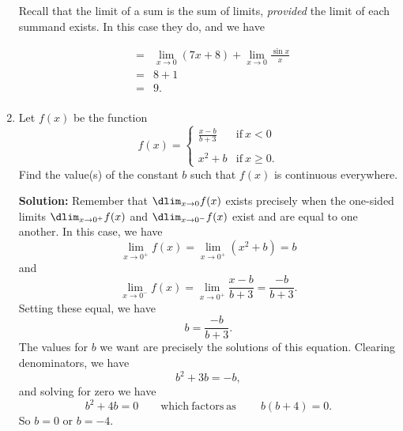 \documentclass{article}
\begin{document}
\begin{enumerate}
Recall that the limit of a sum is the sum of limits, \emph{provided} the limit of each summand exists. In this case they do, and we have

\begin{eqnarray*}
 & = & \lim_{x \rightarrow 0} \left( 7 x + 8 \right) + \lim_{x \rightarrow 0} \frac{\sin x}{x} \\
 & = & 8 + 1 \\
 & = & 9. \\
\end{eqnarray*}


  

\item Let $f(x)$ be the function \[ f(x) = \left\{ \begin{array}{ll} \frac{x-b}{b + 3} & \mathrm{if}\ x < 0 \\ & \\ x^2 + b & \mathrm{if}\ x \geq 0. \end{array}\right. \] Find the value(s) of the constant $b$ such that $f(x)$ is continuous everywhere.

\textbf{Solution:} Remember that $\dlim_{x \rightarrow 0} f(x)$ exists precisely when the one-sided limits $\dlim_{x \rightarrow 0^+} f(x)$ and $\dlim_{x \rightarrow 0^-} f(x)$ exist and are equal to one another. In this case, we have \[ \lim_{x \rightarrow 0^+} f(x) = \lim_{x \rightarrow 0^+} (x^2 + b) = b \] and \[ \lim_{x \rightarrow 0^-} f(x) = \lim_{x \rightarrow 0^+} \frac{x-b}{b + 3} = \frac{-b}{b + 3}. \]
Setting these equal, we have \[ b = \frac{-b}{b + 3}. \]
The values for $b$ we want are precisely the solutions of this equation.
Clearing denominators, we have \[ b^2 + 3 b = -b, \] and solving for zero we have \[ b^2 + 4b = 0 \quad\quad \mathrm{which\ factors\ as}\ \quad\quad b (b + 4) = 0. \]
So $b = 0$ or $b = -4$.

  
\end{enumerate}
\end{document}
